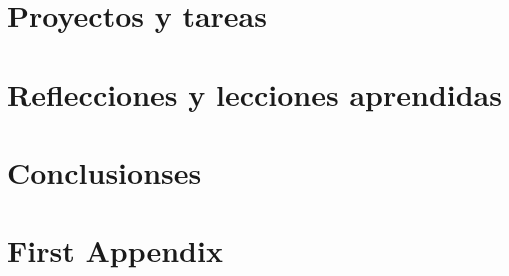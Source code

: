 \documentclass[pdftex,spanish]{pucthesis}	%
\begin{document}
\chapter[PROYECTOS Y TAREAS]{Proyectos y tareas} \label{ch2}


\chapter[REFLECCIONES Y LECCIONES APRENDIDAS]{Reflecciones y lecciones aprendidas} \label{ch3}


\chapter[CONCLUSIONSES]{Conclusionses}





\cleardoublepage
{} \label{references}
\renewcommand{\bibname}{REFERENCIAS}



\printbibliography


\appendix
\chapter[First Appendix]{First Appendix}

\end{document}
